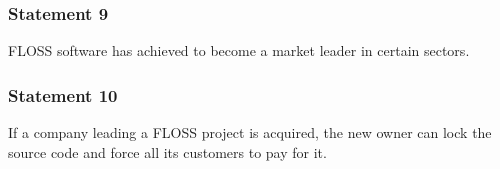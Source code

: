 
\begin{frame}
 \frametitle{Statement 9}
 \begin{center}
  \begin{LARGE} FLOSS software has achieved to become a market leader in certain sectors.  \end{LARGE}
 \end{center}

\end{frame}


\begin{frame}
 \frametitle{Statement 10}
 \begin{center}
  \begin{LARGE} If a company leading a FLOSS project is acquired, the new owner
can lock the source code and force all its customers to pay for it. \end{LARGE}
 \end{center}

\end{frame}

